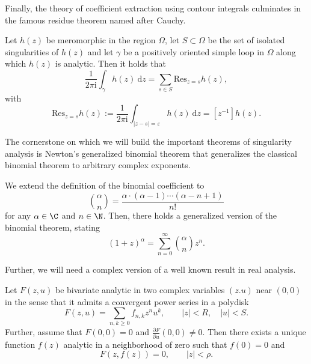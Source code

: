 Finally, the theory of coefficient extraction using contour integrals culminates in the famous residue theorem named after Cauchy.

\begin{theorem}
  Let $h(z)$ be meromorphic in the region $\Omega$, let $S \subset \Omega$ be the set of isolated singularities of $h(z)$ and let $\gamma$ be a positively oriented simple loop in $\Omega$ along which $h(z)$ is analytic. 
  Then it holds that
  $$
    \frac{1}{2\pi \mathrm{i}}\int_{\gamma}h(z)~\mathrm{d}z = \sum_{s \in S} \mathrm{Res}_{z=s}h(z),
  $$
  with 
  $$
    \mathrm{Res}_{z=s}h(z) := \frac{1}{2\pi \mathrm{i}} \int_{|z-s| = \varepsilon} h(z) ~\mathrm{d}z = [z^{-1}]h(z).
  $$
\end{theorem}

The cornerstone on which we will build the important theorems of singularity analysis is Newton's generalized binomial theorem that generalizes the classical binomial theorem to arbitrary complex exponents.

\begin{theorem} \label{thm:newton}
  We extend the definition of the binomial coefficient to 
  $$
  \binom{\alpha}{n} = \frac{\alpha \cdot (\alpha - 1) \cdots (\alpha - n + 1)}{n!}
  $$
  for any $\alpha \in \C$ and $n \in \N$.
  Then, there holds a generalized version of the binomial theorem, stating
  \begin{equation*}
    (1 + z)^\alpha = \sum_{n = 0}^{\infty} \binom{\alpha}{n}z^n.
  \end{equation*}
\end{theorem}

Further, we will need a complex version of a well known result in real analysis.

\begin{theorem} \label{thm:implicit_function}
  Let $F(z,u)$ be bivariate analytic in two complex variables $(z.u)$ near $(0,0)$ in the sense that it admits a convergent power series in a polydisk
  $$
    F(z,u) = \sum_{n, k \geq 0} f_{n,k} z^n u^k, \qquad |z| < R, \quad |u| < S.
  $$
  Further, assume that $F(0,0) = 0$ and $\frac{\partial F}{\partial u}(0,0) \neq 0$. 
  Then there exists a unique function $f(z)$ analytic in a neighborhood of zero such that $f(0) = 0$ and
  $$
    F(z,f(z)) = 0, \qquad |z| < \rho.
  $$
\end{theorem}

